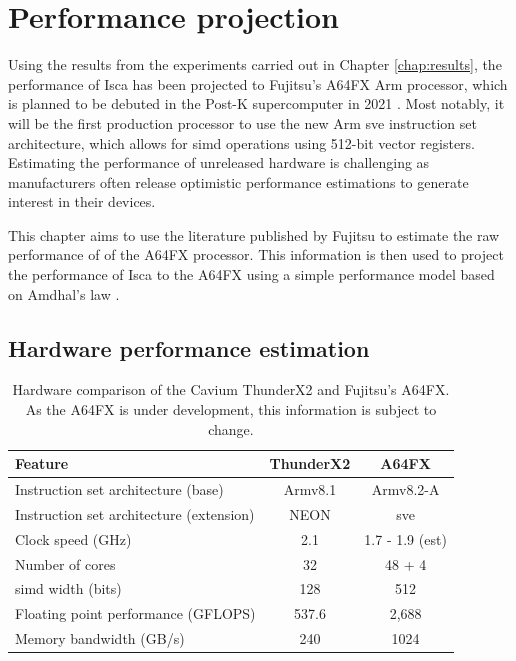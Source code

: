 \documentclass[a4paper,11pt]{report}
\begin{document}
%
%
\chapter{Performance projection}
Using the results from the experiments carried out in Chapter \ref{chap:results}, the performance of Isca has been projected to Fujitsu's A64FX Arm processor, which is planned to be debuted in the Post-K supercomputer in 2021 \cite{yoshida2018fujitsu}. Most notably, it will be the first production processor to use the new Arm \gls{sve} instruction set architecture, which allows for \gls{simd} operations using 512-bit vector registers. Estimating the performance of unreleased hardware is challenging as manufacturers often release optimistic performance estimations to generate interest in their devices.
\par
This chapter aims to use the literature published by Fujitsu to estimate the raw performance of of the A64FX processor. This information is then used to project the performance of Isca to the A64FX using a simple performance model based on Amdhal's law \cite{bach2015est}.

\section{Hardware performance estimation}


\begin{table}[htp]
\caption[Comparison of ThunderX2 and A64FX hardware features]{Hardware comparison of the Cavium ThunderX2 and Fujitsu's A64FX. As the A64FX is under development, this information is subject to change.}
\begin{center}
\begin{tabular}{lcc}
\toprule
\textbf{Feature} 					& \textbf{ThunderX2} & \textbf{A64FX}	\\ \midrule
Instruction set architecture (base)		& Armv8.1			& Armv8.2-A		\\
Instruction set architecture (extension) 	& NEON			& \gls{sve}		\\
Clock speed (GHz) 					& 2.1				& 1.7 - 1.9 (est)		\\
Number of cores 					& 32				& 48 + 4			\\
\gls{simd} width (bits)				& 128			& 512			\\
Floating point performance (GFLOPS)	& 537.6			& 2,688			\\
Memory bandwidth (GB/s)				& 240			& 1024			\\



\bottomrule


\end{tabular}
\end{center}
\label{table:armcomp}
\end{table}%
\end{document}
